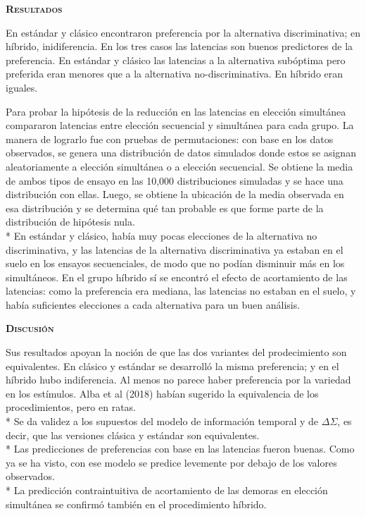 \documentclass[a4paper,12pt]{article}
\begin{document}
{\scshape\bfseries Resultados}

En estándar y clásico encontraron preferencia por la alternativa discriminativa; en híbrido, inidiferencia. En los tres casos las latencias son buenos predictores de la preferencia. En estándar y clásico las latencias a la alternativa subóptima pero preferida eran menores que a la alternativa no-discriminativa. En híbrido eran iguales.

Para probar la hipótesis de la reducción en las latencias en elección simultánea compararon latencias entre elección secuencial y simultánea para cada grupo. La manera de lograrlo fue con pruebas de permutaciones: con base en los datos observados, se genera una distribución de datos simulados donde estos se asignan aleatoriamente a elección simultánea o a elección secuencial. Se obtiene la media de ambos tipos de ensayo en las 10,000 distribuciones simuladas y se hace una distribución con ellas. Luego, se obtiene la ubicación de la media observada en esa distribución y se determina qué tan probable es que forme parte de la distribución de hipótesis nula. \\*
En estándar y clásico, había muy pocas elecciones de la alternativa no discriminativa, y las latencias de la alternativa discriminativa ya estaban en el suelo en los ensayos secuenciales, de modo que no podían disminuir más en los simultáneos. En el grupo híbrido sí se encontró el efecto de acortamiento de las latencias: como la preferencia era mediana, las latencias no estaban en el suelo, y había suficientes elecciones a cada alternativa para un buen análisis.

{\scshape\bfseries Discusión}

Sus resultados apoyan la noción de que las dos variantes del prodecimiento son equivalentes. En clásico y estándar se desarrolló la misma preferencia; y en el híbrido hubo indiferencia. Al menos no parece haber preferencia por la variedad en los estímulos. Alba et al (2018) habían sugerido la equivalencia de los procedimientos, pero en ratas.\\*
Se da validez a los supuestos del modelo de información temporal y de $\Delta\Sigma$, es decir, que las versiones clásica y estándar son equivalentes.\\*
Las predicciones de preferencias con base en las latencias fueron buenas. Como ya se ha visto, con ese modelo se predice levemente por debajo de los valores observados.\\*
La predicción contraintuitiva de acortamiento de las demoras en elección simultánea se confirmó también en el procedimiento híbrido.
\end{document}
